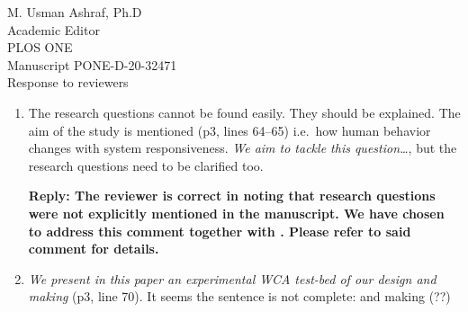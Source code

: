 \documentclass[10pt, letterpaper]{letter}
\newenvironment{QandA}
{\begin{enumerate}[
    label={\bfseries Comment \arabic*:}, 
    wide,
    ref={Comment \arabic*}]}
{\end{enumerate}}
\newenvironment{revised}[2]
{%
\begin{displayquote}
    \medskip
    \begin{flushright}
        \itshape{(Lines \numrange{#1}{#2} in the revised manuscript.)}\normalfont%
    \end{flushright}
    \medskip

}
{\end{displayquote}}
\newenvironment{answered}
{\medskip\par\bfseries Reply: \normalfont}
{\par\noindent\makebox[\linewidth]{\rule{\textwidth}{0.4pt}}\bigskip}
\begin{document}
\begin{letter}{
    M. Usman Ashraf, Ph.D\\
    Academic Editor\\
    PLOS ONE\\
    \medskip
    Manuscript PONE-D-20-32471\\
    Response to reviewers\\
}
\begin{QandA}
    This sentence needs some more clarifications regarding user behaviour and experience:
    bringing some examples for user behaviour and specifying the experience may help to better understand it.
    For instance, if the experience is an experience about the use of such applications then it needs to add ``use experience'' to make it clear.

    \begin{answered}
        We agree with the reviewer, and have thus modified this section of the text to make it more clear by adding some examples:

        \begin{revised}{53}{59}
            Characterizing the relationships between system responsiveness and user behavior and quality of experience is of paramount importance for the design and evaluation of these applications.
            It is generally acknowledged, for instance, that a system going from a state of high responsiveness to one of low responsiveness can cause a drop in quality of experience~\autocite{dabrowsky:2011:40years}. 
            Furthermore, this could cause users to modify the temporal paramaters of their behavior when interacting with the system, generating a sort of \emph{feedback loop} between user and system.
            A clear understanding of these relationships would allow, for instance, for the development of strategies for load balancing and optimization for large-scale deployment of WCA.\@
        \end{revised}
    \end{answered}


    \item\label{it:questions} The research questions cannot be found easily.
    They should be explained.
    The aim of the study is mentioned (p3, lines 64--65) i.e.\ how human behavior changes with system responsiveness. 
    \emph{We aim to tackle this question…}, but the research questions need to be clarified too.

    \begin{answered}
        The reviewer is correct in noting that research questions were not explicitly mentioned in the manuscript.
        We have chosen to address this comment together with .
        Please refer to said comment for details.
    \end{answered}

    \item \emph{We present in this paper an experimental WCA test-bed of our design and making} (p3, line 70).
    It seems the sentence is not complete: and making (??)


\end{QandA}
\end{letter}
\end{document}
